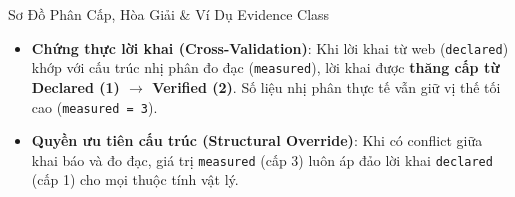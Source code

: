 \documentclass[aspectratio=169, xcolor=table]{beamer}
\begin{document}
\begin{frame}{Sơ Đồ Phân Cấp, Hòa Giải \& Ví Dụ Evidence Class}
\begin{center}
{
    }
    \end{center}
    \vspace{-0.25cm}
    \begin{infobox}
        \scriptsize
        \begin{itemize}
            \item \textbf{Chứng thực lời khai (Cross-Validation)}: Khi lời khai từ web (\texttt{declared}) khớp với cấu trúc nhị phân đo đạc (\texttt{measured}), lời khai được \textbf{thăng cấp từ Declared (1) $\to$ Verified (2)}. Số liệu nhị phân thực tế vẫn giữ vị thế tối cao (\texttt{measured = 3}).
            \item \textbf{Quyền ưu tiên cấu trúc (Structural Override)}: Khi có conflict giữa khai báo và đo đạc, giá trị \texttt{measured} (cấp 3) luôn áp đảo lời khai \texttt{declared} (cấp 1) cho mọi thuộc tính vật lý.
        \end{itemize}
    \end{infobox}
\end{frame}

\end{document}
